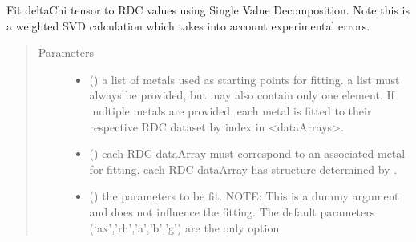 \documentclass[a4paper,10pt,english,openany,oneside]{sphinxmanual}
\begin{document}
\begin{fulllineitems}
\label{\detokenize{reference/generated/paramagpy.fit.svd_fit_metal_from_rdc:paramagpy.fit.svd_fit_metal_from_rdc}}
\sphinxAtStartPar
Fit deltaChi tensor to RDC values using Single Value Decomposition.
Note this is a weighted SVD calculation which takes into account
experimental errors.
\begin{quote}\begin{description}
\item[{Parameters}] \leavevmode\begin{itemize}
\item {} 
\sphinxAtStartPar
{} () \textendash{} a list of metals used as starting points for fitting.
a list must always be provided, but may also contain
only one element. If multiple metals are provided, each metal
is fitted to their respective RDC dataset by index in \textless{}dataArrays\textgreater{}.

\item {} 
\sphinxAtStartPar
{} () \textendash{} each RDC dataArray must correspond to an associated metal for fitting.
each RDC dataArray has structure determined by
{\hyperref[\detokenize{reference/generated/paramagpy.protein.CustomStructure.parse:paramagpy.protein.CustomStructure.parse}]{}}.

\item {} 
\sphinxAtStartPar
{} () \textendash{} the parameters to be fit.
NOTE: This is a dummy argument and does not influence the fitting.
The default parameters (‘ax’,’rh’,’a’,’b’,’g’) are the only option.


\end{itemize}
\end{description}
\end{quote}
\end{fulllineitems}
\end{document}
